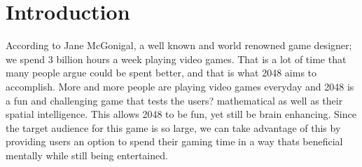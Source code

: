 \documentclass[12pt]{article}
\begin{document}
\newpage
\tableofcontents
\newpage
\listoftables
\newpage

\section{Introduction}
According to Jane McGonigal, a well known and world renowned game designer; we spend 3 billion hours a week playing video games. That is a lot of time that many people argue could be spent better, and that is what 2048 aims to accomplish. More and more people are playing video games everyday and 2048 is a fun and challenging game that tests the users? mathematical as well as their spatial intelligence. This allows 2048 to be fun, yet still be brain enhancing. Since the target audience for this game is so large, we can take advantage of this by providing users an option to spend their gaming time in a way thats beneficial mentally while still being entertained.
\end{document}
